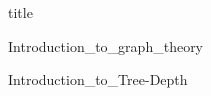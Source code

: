 \documentclass[a4paper,12pt]{article}
\begin{document}
{title}
	
{Introduction_to_graph_theory}

{Introduction_to_Tree-Depth}
\end{document}
